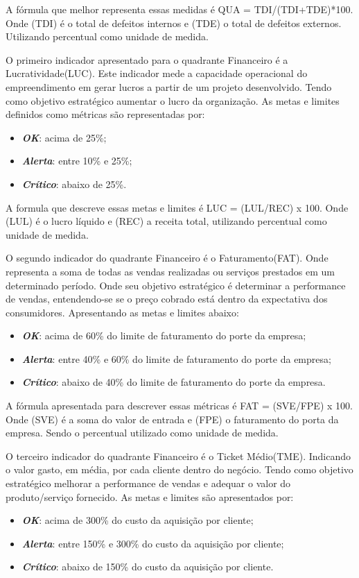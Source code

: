 \documentclass[
	12pt,				%
	openright,			%
	oneside,			%
	a4paper,			%
	english,			%
	brazil				%
	]{abntex2}
\begin{document}
A fórmula que melhor representa essas medidas é QUA = TDI/(TDI+TDE)*100. Onde (TDI) é o total de defeitos internos e (TDE) o total de defeitos externos. Utilizando percentual como unidade de medida.

O primeiro indicador apresentado para o quadrante Financeiro é a Lucratividade(LUC). Este indicador mede a capacidade operacional do empreendimento em gerar lucros a partir de um projeto desenvolvido. Tendo como objetivo estratégico aumentar o lucro da organização. As metas e limites definidos como métricas são representadas por:
\begin{itemize}
\item  \textbf{\textit{OK}}: acima de 25\%;
\item  \textbf{\textit{Alerta}}: entre 10\% e 25\%;
\item  \textbf{\textit{Crítico}}: abaixo de 25\%.
\end{itemize}

A formula que descreve essas metas e limites é LUC = (LUL/REC) x 100. Onde (LUL) é o lucro líquido  e (REC) a receita total, utilizando percentual como unidade de medida.

O segundo indicador do quadrante Financeiro é o Faturamento(FAT). Onde representa a soma de todas as vendas realizadas ou serviços prestados em um determinado período. Onde seu objetivo estratégico é determinar a performance de vendas, entendendo-se se o preço cobrado está dentro da expectativa dos consumidores. Apresentando as metas e limites abaixo:
\begin{itemize}
\item  \textbf{\textit{OK}}: acima de 60\% do limite de faturamento do porte da empresa;
\item  \textbf{\textit{Alerta}}: entre 40\% e 60\% do limite de faturamento do porte da empresa;
\item  \textbf{\textit{Crítico}}: abaixo de 40\% do limite de faturamento do porte da empresa.
\end{itemize}

A fórmula apresentada para descrever essas métricas é FAT = (SVE/FPE) x 100. Onde (SVE) é a soma do valor de entrada e (FPE) o faturamento do porta da empresa. Sendo o percentual utilizado como unidade de medida.

O terceiro indicador do quadrante Financeiro é o Ticket Médio(TME). Indicando o valor gasto, em média, por cada cliente dentro do negócio. Tendo como objetivo estratégico melhorar a performance de vendas e adequar o valor do produto/serviço fornecido. As metas e limites são apresentados por:
\begin{itemize}
\item  \textbf{\textit{OK}}: acima de 300\% do custo da aquisição por cliente;
\item  \textbf{\textit{Alerta}}: entre 150\% e 300\% do custo da aquisição por cliente;
\item  \textbf{\textit{Crítico}}: abaixo de 150\% do custo da aquisição por cliente.
\end{itemize}
\end{document}
